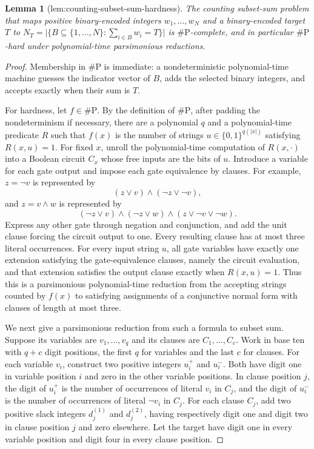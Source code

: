 \documentclass{article}
\newtheorem{lemma}{Lemma}
\begin{document}
\begin{lemma}[lem:counting-subset-sum-hardness]\label{lem:counting-subset-sum-hardness}
The counting subset-sum problem that maps positive binary-encoded integers \(w_1,\ldots,w_N\) and a binary-encoded target \(T\) to \(N_T=\lvert\{B\subseteq\{1,\ldots,N\}:\sum_{i\in B}w_i=T\}\rvert\) is \(\#\mathrm P\)-complete, and in particular \(\#\mathrm P\)-hard under polynomial-time parsimonious reductions.
\end{lemma}
\begin{proof}
Membership in \(\#\mathrm P\) is immediate: a nondeterministic polynomial-time machine guesses the indicator vector of \(B\), adds the selected binary integers, and accepts exactly when their sum is \(T\).

For hardness, let \(f\in\#\mathrm P\). By the definition of \(\#\mathrm P\), after padding the nondeterminism if necessary, there are a polynomial \(q\) and a polynomial-time predicate \(R\) such that \(f(x)\) is the number of strings \(u\in\{0,1\}^{q(\lvert x\rvert)}\) satisfying \(R(x,u)=1\). For fixed \(x\), unroll the polynomial-time computation of \(R(x,\cdot)\) into a Boolean circuit \(C_x\) whose free inputs are the bits of \(u\). Introduce a variable for each gate output and impose each gate equivalence by clauses. For example, \(z=\neg v\) is represented by
\[
(z\vee v)\wedge(\neg z\vee\neg v),
\]
and \(z=v\wedge w\) is represented by
\[
(\neg z\vee v)\wedge(\neg z\vee w)
 \wedge(z\vee\neg v\vee\neg w).
\]
Express any other gate through negation and conjunction, and add the unit clause forcing the circuit output to one. Every resulting clause has at most three literal occurrences. For every input string \(u\), all gate variables have exactly one extension satisfying the gate-equivalence clauses, namely the circuit evaluation, and that extension satisfies the output clause exactly when \(R(x,u)=1\). Thus this is a parsimonious polynomial-time reduction from the accepting strings counted by \(f(x)\) to satisfying assignments of a conjunctive normal form with clauses of length at most three.

We next give a parsimonious reduction from such a formula to subset sum. Suppose its variables are \(v_1,\ldots,v_q\) and its clauses are \(C_1,\ldots,C_c\). Work in base ten with \(q+c\) digit positions, the first \(q\) for variables and the last \(c\) for clauses. For each variable \(v_i\), construct two positive integers \(u_i^+\) and \(u_i^-\). Both have digit one in variable position \(i\) and zero in the other variable positions. In clause position \(j\), the digit of \(u_i^+\) is the number of occurrences of literal \(v_i\) in \(C_j\), and the digit of \(u_i^-\) is the number of occurrences of literal \(\neg v_i\) in \(C_j\). For each clause \(C_j\), add two positive slack integers \(d_j^{(1)}\) and \(d_j^{(2)}\), having respectively digit one and digit two in clause position \(j\) and zero elsewhere. Let the target have digit one in every variable position and digit four in every clause position.


\end{proof}
\end{document}
